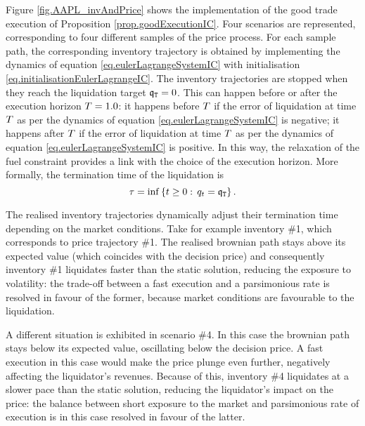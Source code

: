 \documentclass[10pt,a4paper]{article}
\begin{document}
Figure \ref{fig.AAPL_invAndPrice} shows the implementation of the good trade execution of Proposition \ref{prop.goodExecutionIC}. Four scenarios are represented, corresponding to four different samples of the price process. For each sample path, the corresponding inventory trajectory is obtained by implementing the dynamics of equation \eqref{eq.eulerLagrangeSystemIC} with initialisation \eqref{eq.initialisationEulerLagrangeIC}. The inventory trajectories are stopped when they reach the liquidation target $\mathfrak{q}_{\mathtt{T} } = 0$. This can happen before  or after the execution horizon  $T = 1.0$: it happens before $T$ if the error of liquidation at time $T$ as per the dynamics of equation \eqref{eq.eulerLagrangeSystemIC} is negative; it happens after  $T$ if the error of liquidation at time $T$ as per the dynamics of equation \eqref{eq.eulerLagrangeSystemIC} is positive. In this way, the relaxation of the fuel  constraint provides a link with the choice of the execution horizon. More formally, the termination time of the liquidation is 
\begin{equation*}
\tau = \inf \left\lbrace t\geq 0 : \, q_t = \mathfrak{q}_{\mathtt{T} } \right\rbrace. 
\end{equation*}

The realised inventory trajectories dynamically adjust their termination time depending on the market conditions. Take for example inventory \#1, which corresponds to price trajectory \#1. The realised brownian path stays above its expected value (which coincides with the decision price) and consequently inventory \#1 liquidates faster than the static solution, reducing the exposure to volatility: the trade-off between a fast execution and a parsimonious rate is resolved in favour of the former, because market conditions are favourable to the liquidation. 

A different situation is exhibited in scenario \#4. In this case the brownian path stays below its expected value, oscillating below the decision price. A fast execution in this case would make the price plunge even further, negatively affecting the liquidator's revenues. Because of this, inventory \#4 liquidates at a slower pace than the static solution, reducing the liquidator's impact on the price: the balance between short exposure to the market and parsimonious rate of execution is in this case resolved in favour of the latter. 
\end{document}
